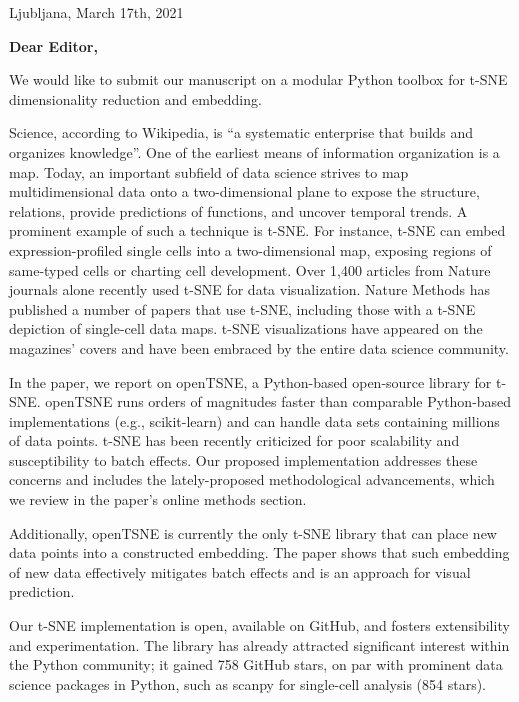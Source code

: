 \documentclass[11pt]{article}
\begin{document}
\begin{flushright}
Ljubljana, March 17th, 2021
\end{flushright}

\begin{flushleft}
{\bf Dear Editor,}

We would like to submit our manuscript on a modular Python toolbox for t-SNE dimensionality reduction and embedding.

Science, according to Wikipedia, is ``a systematic enterprise that builds and organizes knowledge''. One of the earliest means of information organization is a map. Today, an important subfield of data science strives to map multidimensional data onto a two-dimensional plane to expose the structure, relations, provide predictions of functions, and uncover temporal trends. A prominent example of such a technique is t-SNE. For instance, t-SNE can embed expression-profiled single cells into a two-dimensional map, exposing regions of same-typed cells or charting cell development. Over 1,400 articles from Nature journals alone recently used t-SNE for data visualization. Nature Methods has published a number of papers that use t-SNE, including those with a t-SNE depiction of single-cell data maps. t-SNE visualizations have appeared on the magazines' covers and have been embraced by the entire data science community.

In the paper, we report on openTSNE, a Python-based open-source library for t-SNE. openTSNE runs orders of magnitudes faster than comparable Python-based implementations (e.g., scikit-learn) and can handle data sets containing millions of data points. t-SNE has been recently criticized for poor scalability and susceptibility to batch effects. Our proposed implementation addresses these concerns and includes the lately-proposed methodological advancements, which we review in the paper's online methods section.

Additionally, openTSNE is currently the only t-SNE library that can place new data points into a constructed embedding. The paper shows that such embedding of new data effectively mitigates batch effects and is an approach for visual prediction.

Our t-SNE implementation is open, available on GitHub, and fosters extensibility and experimentation. The library has already attracted significant interest within the Python community; it gained 758 GitHub stars, on par with prominent data science packages in Python, such as scanpy for single-cell analysis (854 stars).


\end{flushleft}
\end{document}
